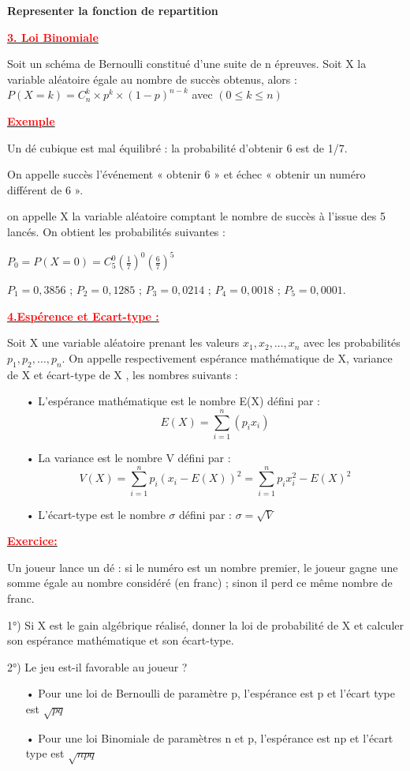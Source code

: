 \documentclass[12pt]{article}
\begin{document}
\textbf{Representer la fonction de repartition}

\underline{\textbf{\textcolor{red}{3. Loi Binomiale}}}

Soit un schéma de Bernoulli constitué d’une suite de n épreuves.
Soit X la variable aléatoire égale au nombre de succès obtenus, alors :\\
$P(X=k)=C_{n}^{k}\times p^{k}\times (1-p)^{n-k}$ avec $(0\leq k\leq n)$

\underline{\textbf{\textcolor{red}{Exemple}}}

Un dé cubique est mal équilibré : la probabilité d’obtenir 6 est de 1/7.

On appelle succès l’événement « obtenir 6 » et échec « obtenir un numéro différent de 6 ».

on appelle X la variable aléatoire comptant le nombre de succès à l’issue des 5 lancés. On obtient les probabilités suivantes :

$P_{0}=P(X=0)=C_{5}^{0}(\frac{1}{7})^{0}(\frac{6}{7})^{5}$

$P_{1} =0,3856$ ; $P_{2} = 0,1285$ ; $P_{3} = 0,0214$ ; $P_{4} = 0,0018$ ; $P_{5} = 0,0001$.

\underline{\textbf{\textcolor{red}{4.Espérence et Ecart-type :}}}

Soit X une variable aléatoire prenant les valeurs $x_{1}, x_{2}, …, x_{n}$ avec les probabilités $p_{1}, p_{2}, …, p_{n}$. On appelle respectivement espérance mathématique de X,
variance de X et écart-type de X , les nombres suivants :
\begin{itemize}
\item[•] L’espérance mathématique est le nombre E(X) défini par : \[E(X)=\sum_{i=1}^{n}(p_{i}x_{i})\]
\item[•] La variance est le nombre V défini par :
\[V(X)=\sum_{i=1}^{n}p_{i}(x_{i}-E(X))^{2}=\sum_{i=1}^{n}p_{i}x_{i}^{2}-E(X)^{2}\]
\item[•]  L’écart-type est le nombre $\sigma$ défini par : $\sigma = \sqrt{V}$
\end{itemize}
\underline{\textbf{\textcolor{red}{Exercice:}}}

Un joueur lance un dé : si le numéro est un nombre premier, le joueur gagne une somme égale au nombre considéré (en franc) ; sinon il perd ce même nombre de franc.

1°) Si X est le gain algébrique réalisé, donner la loi de probabilité de X et calculer son espérance mathématique et son écart-type.

2°) Le jeu est-il favorable au joueur ?

\begin{itemize}
\item[•] Pour une loi de Bernoulli de paramètre p, l’espérance est p et l’écart type est $\sqrt{pq}$
\item[•] Pour une loi Binomiale de paramètres n et p, l’espérance est np et l’écart type est 
$\sqrt{npq} $
\end{itemize}
\end{document}
